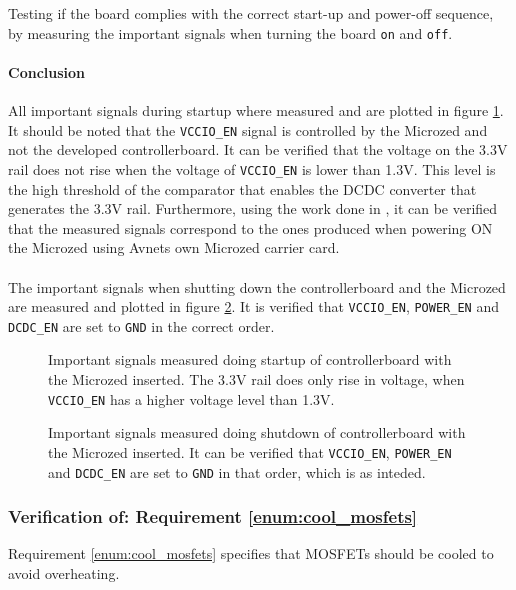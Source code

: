 Testing if the board complies with the correct start-up and power-off sequence, by measuring the important signals when turning the board \texttt{on} and \texttt{off}.

\paragraph{Conclusion}
All important signals during startup where measured and are plotted in figure \ref{fig:controllerboardv2_startup}.
It should be noted that the \texttt{VCCIO\_EN} signal is controlled by the Microzed and not the developed controllerboard. 
It can be verified that the voltage on the 3.3V rail does not rise when the voltage of \texttt{VCCIO\_EN} is lower than 1.3V.
This level is the high threshold of the comparator that enables the DCDC converter that generates the 3.3V rail.
Furthermore, using the work done in \cite{isaswarm}, it can be verified that the measured signals correspond to the ones produced when powering ON the Microzed using Avnets own Microzed carrier card.
\\~\\
The important signals when shutting down the controllerboard and the Microzed are measured and plotted in figure \ref{fig:controllerboardv2_shutdown}.
It is verified that \texttt{VCCIO\_EN}, \texttt{POWER\_EN} and \texttt{DCDC\_EN} are set to \texttt{GND} in the correct order. 

\begin{figure}[h]
	\centering
	\caption[Signals measured doing startup of controllerboard.]{Important signals measured doing startup of controllerboard with the Microzed inserted. The 3.3V rail does only rise in voltage, when \texttt{VCCIO\_EN} has a higher voltage level than 1.3V.}
	\label{fig:controllerboardv2_startup}
\end{figure}

\begin{figure}[h]
	\centering
	\caption[Signals measured doing shutdown of controllerboard.]{Important signals measured doing shutdown of controllerboard with the Microzed inserted. It can be verified that \texttt{VCCIO\_EN}, \texttt{POWER\_EN} and \texttt{DCDC\_EN} are set to \texttt{GND} in that order, which is as inteded.}
	\label{fig:controllerboardv2_shutdown}
\end{figure}

\subsubsection{Verification of: Requirement \ref{enum:cool_mosfets}} %
\label{ssub:requirement_ref_enum:cool_mosfets}
Requirement \ref{enum:cool_mosfets} specifies that MOSFETs should be cooled to avoid overheating. 

